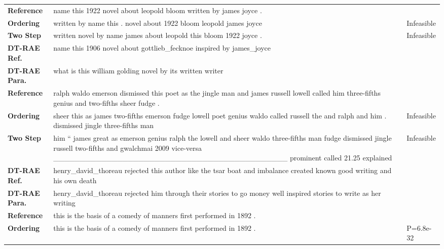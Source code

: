 \documentclass[class=article]{standalone}
\begin{document}
	\newcommand{\collenone}{2.3cm}
	\newcommand{\collentwo}{11cm}
	\newcommand{\collenthree}{2cm}
	\newcommand{\reftitle}{Reference}
	\newcommand{\oracletitle}{Ordering}
	\newcommand{\twosteptitle}{Two Step}
	\newcommand{\iref}{DT-RAE Ref.}
	\newcommand{\ip}{DT-RAE Para.}
	\newcommand{\bm}{VAE Mean}
	\newcommand{\bs}{VAE Sample}
	\begin{table*}
		\small
		\begin{tabular}{ p{\collenone} p{\collentwo} p{\collenthree} }
			
			\textbf{\reftitle}  & name this 1922 novel about leopold bloom written by james joyce . &  \\
			\textbf{\oracletitle}  & written by name this . novel about 1922 bloom leopold james joyce & Infeasible \\
			\textbf{\twosteptitle}  & written novel by name james about leopold this bloom 1922 joyce . & Infeasible \\
			\textbf{\iref}  & name this 1906 novel about gottlieb\_fecknoe inspired by james\_joyce &  \\
			\textbf{\ip}  & what is this william golding novel by its written writer &  \\
			\hline
			\textbf{\reftitle}  & ralph waldo emerson dismissed this poet as the jingle man and james russell lowell called him three-fifths genius and two-fifths sheer fudge . &  \\
			\textbf{\oracletitle}  & sheer this as james two-fifths emerson fudge lowell poet genius waldo called russell the and ralph and him . dismissed jingle three-fifths man & Infeasible \\
			\textbf{\twosteptitle}  & him `` james great as emerson genius ralph the lowell and sheer waldo three-fifths man fudge dismissed jingle russell two-fifths and gwalchmai 2009 vice-versa \_\_\_\_\_\_\_\_\_\_\_\_\_\_\_\_\_\_\_\_\_\_\_\_\_\_\_\_\_\_\_\_\_\_\_\_\_\_\_\_\_\_\_\_ prominent called 21.25 explained & Infeasible \\
			\textbf{\iref}  & henry\_david\_thoreau rejected this author like the tsar boat and imbalance created known good writing and his own death &  \\
			\textbf{\ip}  & henry\_david\_thoreau rejected him through their stories to go money well inspired stories to write as her writing &  \\
			\hline
			\textbf{\reftitle}  & this is the basis of a comedy of manners first performed in 1892 . &  \\
			\textbf{\oracletitle}  & this is the basis of a comedy of manners first performed in 1892 . & P=6.8e-32 \\

\end{tabular}
\end{table*}
\end{document}
